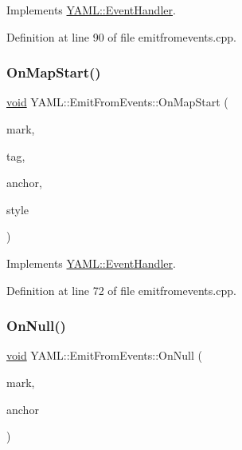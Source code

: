 Implements \mbox{\hyperlink{class_y_a_m_l_1_1_event_handler_a6b8821803de4ecca96a05c3296fb565f}{Y\+A\+M\+L\+::\+Event\+Handler}}.



Definition at line 90 of file emitfromevents.\+cpp.

\mbox{\label{class_y_a_m_l_1_1_emit_from_events_aa303f384381eb99c97563d080efc17cb}} 
\subsubsection{\texorpdfstring{OnMapStart()}{OnMapStart()}}
{\footnotesize\ttfamily \mbox{\hyperlink{glad_8h_a950fc91edb4504f62f1c577bf4727c29}{void}} Y\+A\+M\+L\+::\+Emit\+From\+Events\+::\+On\+Map\+Start (\begin{DoxyParamCaption}\item[{const \mbox{\hyperlink{struct_y_a_m_l_1_1_mark}{Mark}} \&}]{mark,  }\item[{const \mbox{\hyperlink{glad_8h_ac83513893df92266f79a515488701770}{std\+::string}} \&}]{tag,  }\item[{\mbox{\hyperlink{namespace_y_a_m_l_abeff1798814ae3402fc5665fdcad1de6}{anchor\+\_\+t}}}]{anchor,  }\item[{\mbox{\hyperlink{struct_y_a_m_l_1_1_emitter_style_ae86640662c85ce6062a37f9636b6959f}{Emitter\+Style\+::value}}}]{style }\end{DoxyParamCaption})\hspace{0.3cm}{\ttfamily [virtual]}}



Implements \mbox{\hyperlink{class_y_a_m_l_1_1_event_handler_a57fc2477cb1f4fd3a650e41180e6f9b6}{Y\+A\+M\+L\+::\+Event\+Handler}}.



Definition at line 72 of file emitfromevents.\+cpp.

\mbox{\label{class_y_a_m_l_1_1_emit_from_events_a42f9dfed68e58c2f4289550bdde5be61}} 
\subsubsection{\texorpdfstring{OnNull()}{OnNull()}}
{\footnotesize\ttfamily \mbox{\hyperlink{glad_8h_a950fc91edb4504f62f1c577bf4727c29}{void}} Y\+A\+M\+L\+::\+Emit\+From\+Events\+::\+On\+Null (\begin{DoxyParamCaption}\item[{const \mbox{\hyperlink{struct_y_a_m_l_1_1_mark}{Mark}} \&}]{mark,  }\item[{\mbox{\hyperlink{namespace_y_a_m_l_abeff1798814ae3402fc5665fdcad1de6}{anchor\+\_\+t}}}]{anchor }\end{DoxyParamCaption})\hspace{0.3cm}{\ttfamily [virtual]}}



